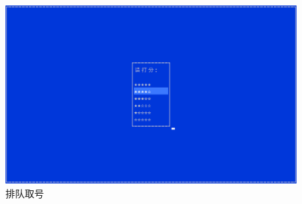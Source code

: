 \documentclass{ctexrep}
\begin{document}
\begin{figure}[H]
  \includegraphics[scale=0.38]{preview_queue_3.png}
  \caption{排队取号}
\end{figure}
\end{document}
